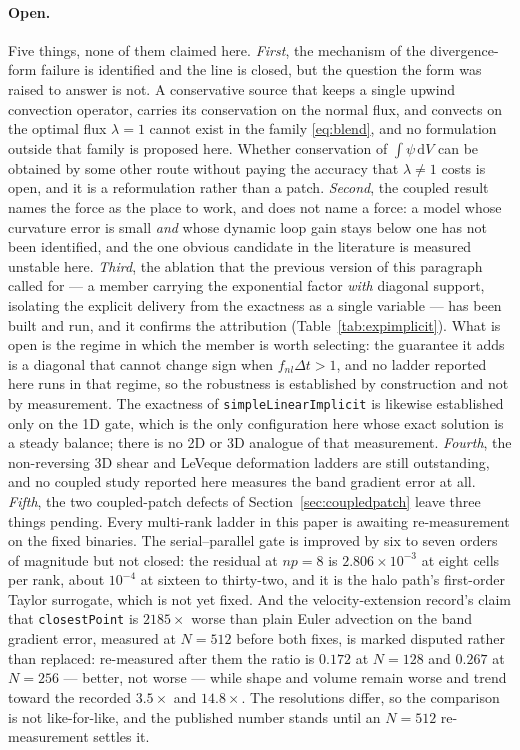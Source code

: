 \documentclass[preprint,3p,11pt]{elsarticle}
\newcommand{\psilev}{\psi}
\begin{document}
\paragraph{Open.}
\label{sec:conclusions-open}
Five things, none of them claimed here. \emph{First}, the mechanism of the
divergence-form failure is identified and the line is closed, but the question the
form was raised to answer is not. A conservative source that keeps a single upwind
convection operator, carries its conservation on the normal flux, and convects on
the optimal flux $\lambda = 1$ cannot exist in the family \eqref{eq:blend}, and no
formulation outside that family is proposed here. Whether conservation of
$\int\psilev\,\mathrm dV$ can be obtained by some other route without paying the
accuracy that $\lambda \neq 1$ costs is open, and it is a reformulation rather than
a patch. \emph{Second}, the coupled result names the force as the place to work,
and does not name a force: a model whose curvature error is small \emph{and} whose
dynamic loop gain stays below one has not been identified, and the one obvious
candidate in the literature is measured unstable here. \emph{Third}, the ablation
that the previous version of this paragraph called for --- a member carrying the
exponential factor \emph{with} diagonal support, isolating the explicit delivery
from the exactness as a single variable --- has been built and run, and it confirms
the attribution (Table~\ref{tab:expimplicit}). What is open is the regime in which
the member is worth selecting: the guarantee it adds is a diagonal that cannot
change sign when $f_{nl}\Delta t > 1$, and no ladder reported here runs in that
regime, so the robustness is established by construction and not by measurement.
The exactness of \texttt{simpleLinearImplicit} is likewise established only on the
1D gate, which is the only configuration here whose exact solution is a steady
balance; there is no 2D or 3D analogue of that measurement. \emph{Fourth}, the
non-reversing 3D shear and LeVeque deformation ladders are still outstanding, and
no coupled study reported here measures the band gradient error at all.
\emph{Fifth}, the two coupled-patch defects of Section~\ref{sec:coupledpatch}
leave three things pending. Every multi-rank ladder in this paper is awaiting
re-measurement on the fixed binaries. The serial--parallel gate is improved by six
to seven orders of magnitude but not closed: the residual at $np=8$ is
$2.806\times10^{-3}$ at eight cells per rank, about $10^{-4}$ at sixteen to
thirty-two, and it is the halo path's first-order Taylor surrogate, which is not
yet fixed. And the velocity-extension record's claim that \texttt{closestPoint} is
$2185\times$ worse than plain Euler advection on the band gradient error, measured
at $N=512$ before both fixes, is marked disputed rather than replaced: re-measured
after them the ratio is $0.172$ at $N=128$ and $0.267$ at $N=256$ --- better, not
worse --- while shape and volume remain worse and trend toward the recorded
$3.5\times$ and $14.8\times$. The resolutions differ, so the comparison is not
like-for-like, and the published number stands until an $N=512$ re-measurement
settles it.
\end{document}
